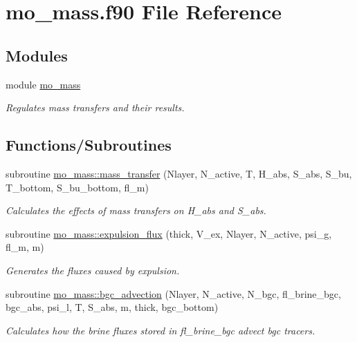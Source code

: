 \hypertarget{mo__mass_8f90}{
\section{mo\_\-mass.f90 File Reference}
\label{mo__mass_8f90}
}
\subsection*{Modules}
\begin{DoxyCompactItemize}
\item 
module \hyperlink{namespacemo__mass}{mo\_\-mass}


\begin{DoxyCompactList}\small\item\em Regulates mass transfers and their results. \item\end{DoxyCompactList}

\end{DoxyCompactItemize}
\subsection*{Functions/Subroutines}
\begin{DoxyCompactItemize}
\item 
subroutine \hyperlink{namespacemo__mass_a41bcbec215f56133154de8249421c5cf}{mo\_\-mass::mass\_\-transfer} (Nlayer, N\_\-active, T, H\_\-abs, S\_\-abs, S\_\-bu, T\_\-bottom, S\_\-bu\_\-bottom, fl\_\-m)
\begin{DoxyCompactList}\small\item\em Calculates the effects of mass transfers on H\_\-abs and S\_\-abs. \item\end{DoxyCompactList}\item 
subroutine \hyperlink{namespacemo__mass_a6e8bfe7e768a83a31407eb4771b1fead}{mo\_\-mass::expulsion\_\-flux} (thick, V\_\-ex, Nlayer, N\_\-active, psi\_\-g, fl\_\-m, m)
\begin{DoxyCompactList}\small\item\em Generates the fluxes caused by expulsion. \item\end{DoxyCompactList}\item 
subroutine \hyperlink{namespacemo__mass_aafe4d8270d3f10cd77b9622b40d6da8a}{mo\_\-mass::bgc\_\-advection} (Nlayer, N\_\-active, N\_\-bgc, fl\_\-brine\_\-bgc, bgc\_\-abs, psi\_\-l, T, S\_\-abs, m, thick, bgc\_\-bottom)
\begin{DoxyCompactList}\small\item\em Calculates how the brine fluxes stored in fl\_\-brine\_\-bgc advect bgc tracers. \item\end{DoxyCompactList}\end{DoxyCompactItemize}

